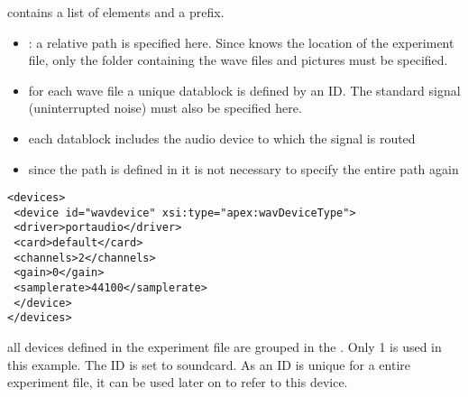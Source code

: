  contains a list of 
elements and a prefix.

\begin{itemize}
\item {}: a relative path is specified here.
Since \apex knows the location of the experiment file, only the
folder containing the wave files and pictures must be specified.



\item {} for each wave file a unique datablock is
defined by an ID. The standard signal (uninterrupted noise) must
also be specified here.

\item {} each datablock includes the audio device to
which the signal is routed

\item {} since the path is defined in
 it is not necessary to specify the entire
path again

  
 

\end{itemize}
\begin{lstlisting}
<devices>
 <device id="wavdevice" xsi:type="apex:wavDeviceType">
 <driver>portaudio</driver>
 <card>default</card>
 <channels>2</channels>
 <gain>0</gain>
 <samplerate>44100</samplerate>
 </device>
</devices>
\end{lstlisting}


 all devices defined in the experiment file are
grouped in the . Only 1  is used
in this example. The ID is set to soundcard. As an ID is unique
for a entire experiment file, it can be used later on to refer to
this device.

